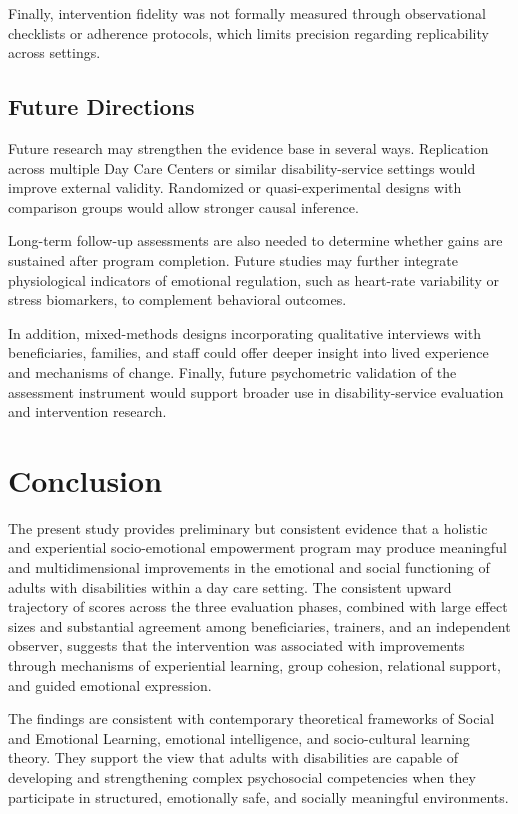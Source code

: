 \documentclass[journal]{IEEEtran}
\begin{document}
Finally, intervention fidelity was not formally measured through observational checklists or adherence protocols, which limits precision regarding replicability across settings.

\subsection{Future Directions}

Future research may strengthen the evidence base in several ways. Replication across multiple Day Care Centers or similar disability-service settings would improve external validity. Randomized or quasi-experimental designs with comparison groups would allow stronger causal inference.

Long-term follow-up assessments are also needed to determine whether gains are sustained after program completion. Future studies may further integrate physiological indicators of emotional regulation, such as heart-rate variability or stress biomarkers, to complement behavioral outcomes.

In addition, mixed-methods designs incorporating qualitative interviews with beneficiaries, families, and staff could offer deeper insight into lived experience and mechanisms of change. Finally, future psychometric validation of the assessment instrument would support broader use in disability-service evaluation and intervention research.


\section{Conclusion}

The present study provides preliminary but consistent evidence that a holistic and experiential socio-emotional empowerment program may produce meaningful and multidimensional improvements in the emotional and social functioning of adults with disabilities within a day care setting. The consistent upward trajectory of scores across the three evaluation phases, combined with large effect sizes and substantial agreement among beneficiaries, trainers, and an independent observer, suggests that the intervention was associated with improvements through mechanisms of experiential learning, group cohesion, relational support, and guided emotional expression.

The findings are consistent with contemporary theoretical frameworks of Social and Emotional Learning, emotional intelligence, and socio-cultural learning theory. They support the view that adults with disabilities are capable of developing and strengthening complex psychosocial competencies when they participate in structured, emotionally safe, and socially meaningful environments.
\end{document}
